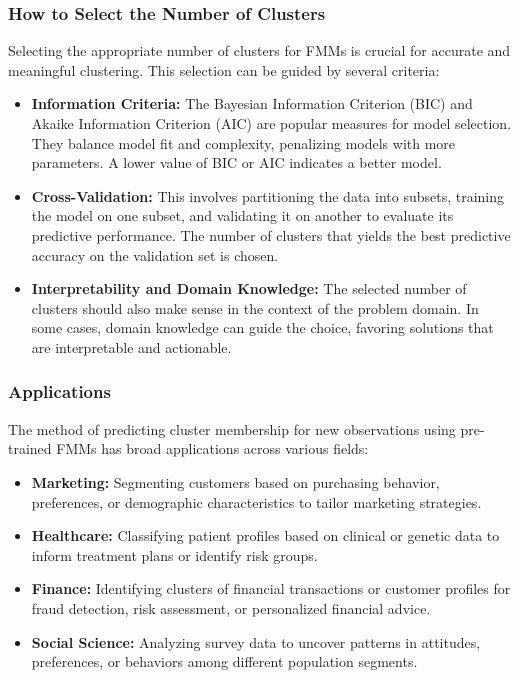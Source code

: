 \documentclass{article}
\begin{document}
\subsubsection*{How to Select the Number of Clusters}

Selecting the appropriate number of clusters for FMMs is crucial for accurate and meaningful clustering. This selection can be guided by several criteria:

\begin{itemize}
    \item \textbf{Information Criteria:} The Bayesian Information Criterion (BIC) and Akaike Information Criterion (AIC) are popular measures for model selection. They balance model fit and complexity, penalizing models with more parameters. A lower value of BIC or AIC indicates a better model.
    \item \textbf{Cross-Validation:} This involves partitioning the data into subsets, training the model on one subset, and validating it on another to evaluate its predictive performance. The number of clusters that yields the best predictive accuracy on the validation set is chosen.
    \item \textbf{Interpretability and Domain Knowledge:} The selected number of clusters should also make sense in the context of the problem domain. In some cases, domain knowledge can guide the choice, favoring solutions that are interpretable and actionable.
\end{itemize}

\subsubsection*{Applications}

The method of predicting cluster membership for new observations using pre-trained FMMs has broad applications across various fields:

\begin{itemize}
    \item \textbf{Marketing:} Segmenting customers based on purchasing behavior, preferences, or demographic characteristics to tailor marketing strategies.
    \item \textbf{Healthcare:} Classifying patient profiles based on clinical or genetic data to inform treatment plans or identify risk groups.
    \item \textbf{Finance:} Identifying clusters of financial transactions or customer profiles for fraud detection, risk assessment, or personalized financial advice.
    \item \textbf{Social Science:} Analyzing survey data to uncover patterns in attitudes, preferences, or behaviors among different population segments.
\end{itemize}
\end{document}

